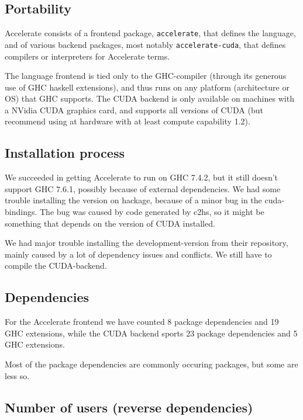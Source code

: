 \subsection{Portability}

Accelerate consists of a frontend package, \texttt{accelerate}, that defines
the language, and of various backend packages, most notably
\texttt{accelerate-cuda}, that defines compilers or interpreters for Accelerate
terms.

The language frontend is tied only to the GHC-compiler (through its generous
use of GHC haskell extensions), and thus runs on any platform (architecture or
OS) that GHC supports.
The CUDA backend is only available on machines with a NVidia CUDA graphics
card, and supports all versions of CUDA (but recommend using at hardware with
at least compute capability 1.2).

\subsection{Installation process}

We succeeded in getting Accelerate to run on GHC 7.4.2, but it still doesn't
support GHC 7.6.1, possibly because of external dependencies.
We had some trouble installing the version on hackage, because of a
minor bug in the cuda-bindings. The bug was caused by code generated
by c2hs, so it might be something that depends on the version of CUDA
installed.

We had major trouble installing the development-version from their
repository, mainly caused by a lot of dependency issues and
conflicts. We still have to compile the CUDA-backend.

\subsection{Dependencies}

For the Accelerate frontend we have counted 8 package dependencies and 19 GHC
extensions, while the CUDA backend sports 23 package dependencies and 5 GHC
extensions.

Most of the package dependencies are commonly occuring packages, but some are
less so.

\subsection{Number of users (reverse dependencies)}
